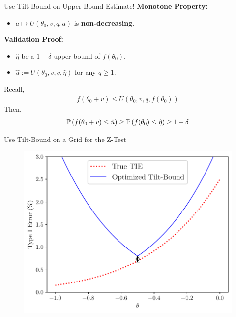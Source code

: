 \begin{frame}{Use Tilt-Bound on Upper Bound Estimate!}
\textbf{Monotone Property:}
\begin{itemize}
    \item $a \mapsto U(\theta_0, v, q, a)$ is \textbf{non-decreasing}.
\end{itemize}

\textbf{Validation Proof:} 
\begin{itemize}
    \item $\hat{\eta}$ be a $1-\delta$ upper bound of $f(\theta_0)$.
    \item $\hat{u} := U(\theta_0, v, q, \hat{\eta})$ for any $q \geq 1$.
\end{itemize}
Recall,
\begin{align*}
    f(\theta_0 + v)
    \leq
    U(\theta_0, v, q, f(\theta_0))
\end{align*}
Then,
\begin{align*}
    \mathbb{P}\left( f(\theta_0+v) \leq \hat{u} \right)
    \geq
    \mathbb{P}\left( f(\theta_0) \leq \hat{\eta} \right)
    \geq
    1-\delta
\end{align*}
\end{frame}

\begin{frame}{Use Tilt-Bound on a Grid for the Z-Test}
\begin{figure}
    \centering
    \includegraphics[width=0.95\linewidth]{figs/validation_1.pdf}
\end{figure} 
\end{frame}

